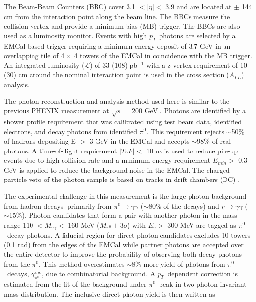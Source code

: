 \documentclass[twocolumn,letterpaper,aps,prl,longbibliography,superscriptaddress,floatfix]{revtex4-2}
\newcommand{\pT}{\ensuremath{p_T}}
\newcommand{\pizero}{\ensuremath{\pi^0}}
\newcommand{\ALL}{\ensuremath{A_{LL}}}
\begin{document}


The Beam-Beam Counters (BBC) \cite{ALLEN2003549} cover 3.1 $< |\eta| <$ 3.9 and are located at $\pm$ 144 cm from the interaction point along the beam line. The BBCs measure the collision vertex and provide a minimum-bias (MB) trigger. The BBCs are also used as a luminosity monitor. Events with high \pT\ photons are selected by a EMCal-based trigger requiring a minimum energy deposit of 3.7 GeV in an overlapping tile of 4 $\times$ 4 towers of the EMCal in coincidence with the MB trigger. An integrated luminosity ($\mathcal{L}$) of 33 (108) pb$^{-1}$ with a z-vertex requirement of 10 (30) cm around the nominal interaction point is used in the cross section (\ALL) analysis.
 
The photon reconstruction and analysis method used here is similar to the previous PHENIX measurement at $\sqrt{s}$ =  200 GeV \cite{PhysRevLett.98.012002,PhysRevD.86.072008}. Photons are identified by a shower profile requirement that was calibrated using test beam data, identified electrons, and decay photons from identified \pizero. This requirement rejects $\sim$50\% of hadrons depositing E $>$ 3 GeV in the EMCal and accepts $\sim$98\% of real photons. A time-of-flight requirement $|ToF| <$ 10 ns is used to reduce pile-up events due to high collision rate and a minimum energy requirement $E_{min} >$ 0.3 GeV is applied to reduce the background noise in the EMCal. The charged particle veto of the photon sample is based on tracks in drift chambers (DC) \cite{ADCOX2003489}. 

The experimental challenge in this measurement is the large photon background from hadron decays, primarily from $\pi^0 \rightarrow \gamma\gamma$ ($\sim$80\% of the decays) and $\eta \rightarrow \gamma\gamma$ ($\sim$15\%). Photon candidates that form a pair with another photon in the mass range 110 $< M_{\gamma\gamma} <$ 160 MeV ($M_{\pi^0} \pm 3\sigma$) with $E_{\gamma} >$ 300 MeV are tagged as \pizero\ decay photons. A fiducial region for direct photon candidates excludes 10 towers (0.1 rad) from the edges of the EMCal while partner photons are accepted over the entire detector to improve the probability of observing both decay photons from the \pizero. This method overestimates $\sim$8\% more yield of photons from \pizero\ decays, $\gamma_{\pi^0}^{inc}$, due to combinatorial background. A \pT\ dependent correction is estimated from the fit of the background under \pizero\ peak in two-photon invariant mass distribution. The inclusive direct photon yield is then written as
\end{document}
